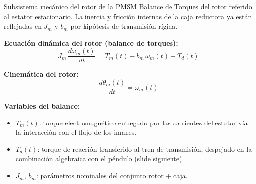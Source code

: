 \documentclass[aspectratio=169,t]{beamer}
\begin{document}
\begin{frame}{Subsistema mecánico del rotor de la PMSM}
{\small\color{uncGray}Balance de Torques del rotor referido al estator estacionario. La inercia y fricción internas de la caja reductora ya están reflejadas en $J_m$ y $b_m$ por hipótesis de transmisión rígida.}\par
\vspace{4mm}

\textbf{Ecuación dinámica del rotor (balance de torques):}
\begin{equation*}
J_m\,\frac{d\omega_m(t)}{dt} = T_m(t) - b_m\,\omega_m(t) - T_d(t)
\end{equation*}

\textbf{Cinemática del rotor:}
\begin{equation*}
\frac{d\theta_m(t)}{dt} = \omega_m(t)
\end{equation*}

\textbf{Variables del balance:}
\begin{itemize}
\item $T_m(t)$: torque electromagnético entregado por las corrientes del estator vía la interacción con el flujo de los imanes.
\item $T_d(t)$: torque de reacción transferido al tren de transmisión, despejado en la combinación algebraica con el péndulo (slide siguiente).
\item $J_m,\,b_m$: parámetros nominales del conjunto rotor + caja.
\end{itemize}
\end{frame}
\end{document}
